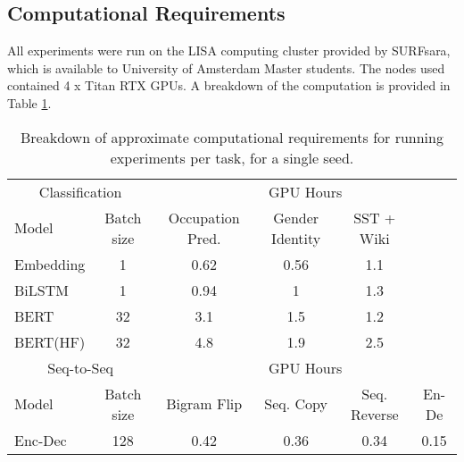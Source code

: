 \newpage

\subsection{Computational Requirements}
\label{sec:infrastructure}

All experiments were run on the LISA computing cluster provided by SURFsara, which is available to University of Amsterdam Master students. The nodes used contained 4 x Titan RTX GPUs. A breakdown of the computation is provided in Table \ref{tab:computation-table}.

\begin{table}
  \caption{Breakdown of approximate computational requirements for running experiments per task, for a single seed.}
  \label{tab:computation-table}
  \centering
   \setlength\tabcolsep{5pt}
  \begin{tabular}{lc|cccc}
    \toprule
    \multicolumn{2}{c}{Classification} & \multicolumn{4}{c}{GPU Hours} \\
    \cmidrule(r){1-6}
    Model     & Batch size       & Occupation Pred.  & Gender Identity & SST + Wiki \\
    \midrule
    Embedding & 1     & 0.62  & 0.56 & 1.1 \\
    BiLSTM     & 1     & 0.94  & 1 & 1.3 \\
    BERT     & 32     & 3.1  & 1.5 & 1.2 \\
    BERT(HF)     & 32    & 4.8  & 1.9 & 2.5 \\
    \toprule
    \multicolumn{2}{c}{Seq-to-Seq} & \multicolumn{4}{c}{GPU Hours} \\
    \cmidrule(r){1-6}
    Model     & Batch size       & Bigram Flip     & Seq. Copy     & Seq. Reverse     & En-De \\
    \midrule
    Enc-Dec & 128  & 0.42  & 0.36 & 0.34 & 0.15 \\
    \bottomrule
  \end{tabular}
\end{table}

